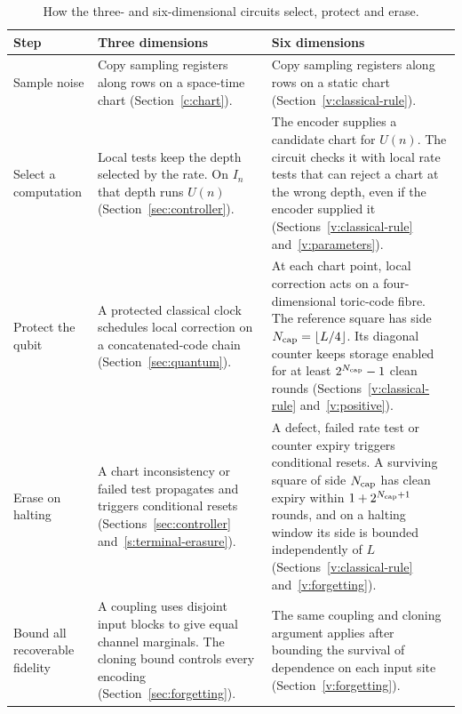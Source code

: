 \begin{table}[!tb]
\centering\small
\caption{How the three- and six-dimensional circuits select, protect and erase.}\label{tab:mechanism}
\begin{tabular}{@{}>{\raggedright\arraybackslash}p{.14\linewidth}>{\raggedright\arraybackslash}p{.4\linewidth}>{\raggedright\arraybackslash}p{.4\linewidth}@{}}
\toprule Step & Three dimensions & Six dimensions\\\midrule
Sample noise & Copy sampling registers along rows on a space-time chart (Section~\ref{c:chart}). & Copy sampling registers along rows on a static chart (Section~\ref{v:classical-rule}).\\\addlinespace[3pt]
Select a computation & Local tests keep the depth selected by the rate. On \(I_n\) that depth runs \(U(n)\) (Section~\ref{sec:controller}). & The encoder supplies a candidate chart for \(U(n)\). The circuit checks it with local rate tests that can reject a chart at the wrong depth, even if the encoder supplied it (Sections~\ref{v:classical-rule} and~\ref{v:parameters}).\\\addlinespace[3pt]
Protect the qubit & A protected classical clock schedules local correction on a concatenated-code chain (Section~\ref{sec:quantum}). & At each chart point, local correction acts on a four-dimensional toric-code fibre. The reference square has side \(N_{\rm cap}=\lfloor L/4\rfloor\). Its diagonal counter keeps storage enabled for at least \(2^{N_{\rm cap}}-1\) clean rounds (Sections~\ref{v:classical-rule} and~\ref{v:positive}).\\\addlinespace[3pt]
Erase on halting & A chart inconsistency or failed test propagates and triggers conditional resets (Sections~\ref{sec:controller} and~\ref{s:terminal-erasure}). & A defect, failed rate test or counter expiry triggers conditional resets. A surviving square of side \(N_{\rm cap}\) has clean expiry within \(1+2^{N_{\rm cap}+1}\) rounds, and on a halting window its side is bounded independently of \(L\) (Sections~\ref{v:classical-rule} and~\ref{v:forgetting}).\\\addlinespace[3pt]
Bound all recoverable fidelity & A coupling uses disjoint input blocks to give equal channel marginals. The cloning bound controls every encoding (Section~\ref{sec:forgetting}). & The same coupling and cloning argument applies after bounding the survival of dependence on each input site (Section~\ref{v:forgetting}).\\
\bottomrule
\end{tabular}
\end{table}

